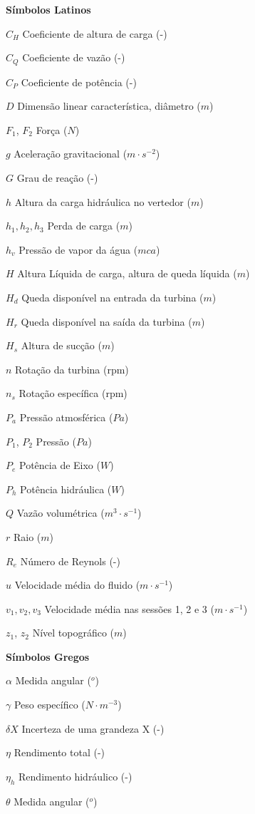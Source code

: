 \begin{simbolos}
\item \textbf{Símbolos Latinos}

  \item[$C_H$] Coeficiente de altura de carga (-)
  \item[$C_Q$] Coeficiente de vazão (-)
  \item[$C_P$] Coeficiente de potência (-)
  \item[$D$] Dimensão linear característica, diâmetro ($m$)
  \item[$F_1$, $F_2$] Força ($N$)
  \item[$g$] Aceleração gravitacional ($m\cdot s^{-2}$)
  \item[$G$] Grau de reação (-)
  \item[$h$] Altura da carga hidráulica no vertedor ($m$)
  \item[$h_1, h_2, h_3$] Perda de carga ($m$)
  \item[$h_v$] Pressão de vapor da água ($mca$)
  \item[$H$] Altura Líquida de carga, altura de queda líquida ($m$)
  \item[$H_d$] Queda disponível na entrada da turbina ($m$)
  \item[$H_r$] Queda disponível na saída da turbina ($m$)
  \item[$H_s$] Altura de sucção ($m$)
  \item[$n$] Rotação da turbina (rpm)
  \item[$n_s$] Rotação específica (rpm)
  \item[$P_a$] Pressão atmosférica ($Pa$)
  \item[$P_1$, $P_2$] Pressão ($Pa$)
  \item[$P_e$] Potência de Eixo ($W$)
  \item[$P_h$] Potência hidráulica ($W$)
  \item[$Q$] Vazão volumétrica ($m^3\cdot s^{-1}$)
  \item[$r$] Raio ($m$)
  \item[$R_e$] Número de Reynols (-)
  \item[$u$] Velocidade média do fluido ($m\cdot s^{-1}$)
  \item[$v_1, v_2, v_3$] Velocidade média nas sessões 1, 2 e 3 ($m\cdot s^{-1}$) 
  \item[$z_1$, $z_2$] Nível topográfico ($m$)

  
\item \textbf{Símbolos Gregos}
  
  
  \item[$\alpha$] Medida angular ($^o$)
  \item[$\gamma$] Peso específico ($N\cdot m^{-3}$)   
  \item[$\delta X$] Incerteza de uma grandeza X (-)
  \item[$\eta$] Rendimento total (-)
  \item[$\eta_h$] Rendimento hidráulico (-)
  \item[$\theta$] Medida angular ($^o$)


\end{simbolos}
